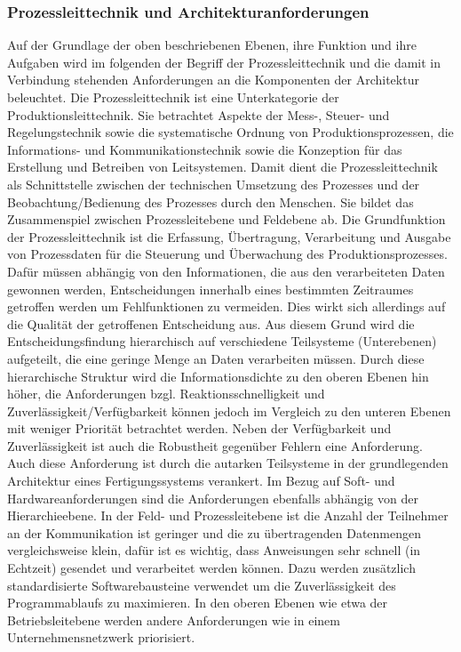 \subsubsection{Prozessleittechnik und Architekturanforderungen}
Auf der Grundlage der oben beschriebenen Ebenen, ihre Funktion und ihre Aufgaben wird im folgenden der Begriff der Prozessleittechnik und die damit in Verbindung stehenden Anforderungen an die Komponenten der Architektur beleuchtet. 
Die Prozessleittechnik ist eine Unterkategorie der Produktionsleittechnik. Sie betrachtet Aspekte der Mess-, Steuer- und Regelungstechnik sowie die systematische Ordnung von Produktionsprozessen, die Informations- und Kommunikationstechnik sowie die Konzeption für das Erstellung und Betreiben von Leitsystemen. Damit dient die Prozessleittechnik als Schnittstelle zwischen der technischen Umsetzung des Prozesses und der Beobachtung/Bedienung des Prozesses durch den Menschen. Sie bildet das Zusammenspiel zwischen Prozessleitebene und Feldebene ab. 
Die Grundfunktion der Prozessleittechnik ist die Erfassung, Übertragung, Verarbeitung und Ausgabe von Prozessdaten für die Steuerung und Überwachung des Produktionsprozesses. Dafür müssen abhängig von den Informationen, die aus den verarbeiteten Daten gewonnen werden, Entscheidungen innerhalb eines bestimmten Zeitraumes getroffen werden um Fehlfunktionen zu vermeiden. Dies wirkt sich allerdings auf die Qualität der getroffenen Entscheidung aus. Aus diesem Grund wird die Entscheidungsfindung hierarchisch auf verschiedene Teilsysteme (Unterebenen) aufgeteilt, die eine geringe Menge an Daten verarbeiten müssen. Durch diese hierarchische Struktur wird die Informationsdichte zu den oberen Ebenen hin höher, die Anforderungen bzgl. Reaktionsschnelligkeit und Zuverlässigkeit/Verfügbarkeit können jedoch im Vergleich zu den unteren Ebenen mit weniger Priorität betrachtet werden. 
Neben der Verfügbarkeit und Zuverlässigkeit ist auch die Robustheit gegenüber Fehlern eine Anforderung. Auch diese Anforderung ist durch die autarken Teilsysteme in der grundlegenden Architektur eines Fertigungssystems verankert.
Im Bezug auf Soft- und Hardwareanforderungen sind die Anforderungen ebenfalls abhängig von der Hierarchieebene. In der Feld- und Prozessleitebene ist die Anzahl der Teilnehmer an der Kommunikation ist geringer und die zu übertragenden Datenmengen vergleichsweise klein, dafür ist es wichtig, dass Anweisungen sehr schnell (in Echtzeit) gesendet und verarbeitet werden können. Dazu werden zusätzlich standardisierte Softwarebausteine verwendet um die Zuverlässigkeit des Programmablaufs zu maximieren. 
In den oberen Ebenen wie etwa der Betriebsleitebene werden andere Anforderungen wie in einem Unternehmensnetzwerk priorisiert. 

